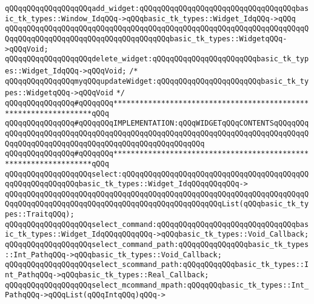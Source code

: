 \newline
\verb|qQQqqQQqqQQqqQQqqQQqadd_widget:qQQqqQQqqQQqqQQqqQQqqQQqqQQqqQQqqQQqbasic_tk_types::Window_IdqQQq->qQQqbasic_tk_types::Widget_IdqQQq->qQQq|\newline
\verb|qQQqqQQqqQQqqQQqqQQqqQQqqQQqqQQqqQQqqQQqqQQqqQQqqQQqqQQqqQQqqQQqqQQqqQQqqQQqqQQqqQQqqQQqqQQqqQQqqQQqqQQqqQQqbasic_tk_types::WidgetqQQq->qQQqVoid;|\newline
\verb|qQQqqQQqqQQqqQQqqQQqdelete_widget:qQQqqQQqqQQqqQQqqQQqqQQqbasic_tk_types::Widget_IdqQQq->qQQqVoid;|\newline
\verb|/*|\newline
\verb|qQQqqQQqqQQqqQQqmyqQQqupdateWidget:qQQqqQQqqQQqqQQqqQQqqQQqbasic_tk_types::WidgetqQQq->qQQqVoid|\newline
\verb|*/|\newline
\newline
\verb|qQQqqQQqqQQqqQQq#qQQqqQQq*****************************************************************qQQq|\newline
\verb|qQQqqQQqqQQqqQQq#qQQqqQQqIMPLEMENTATION:qQQqWIDGETqQQqCONTENTSqQQqqQQqqQQqqQQqqQQqqQQqqQQqqQQqqQQqqQQqqQQqqQQqqQQqqQQqqQQqqQQqqQQqqQQqqQQqqQQqqQQqqQQqqQQqqQQqqQQqqQQqqQQqqQQqqQQqqQQqqQQq|\newline
\verb|qQQqqQQqqQQqqQQq#qQQqqQQq*****************************************************************qQQq|\newline
\newline
\verb|qQQqqQQqqQQqqQQqqQQqselect:qQQqqQQqqQQqqQQqqQQqqQQqqQQqqQQqqQQqqQQqqQQqqQQqqQQqqQQqqQQqbasic_tk_types::Widget_IdqQQqqQQqqQQq->|\newline
\verb|qQQqqQQqqQQqqQQqqQQqqQQqqQQqqQQqqQQqqQQqqQQqqQQqqQQqqQQqqQQqqQQqqQQqqQQqqQQqqQQqqQQqqQQqqQQqqQQqqQQqqQQqqQQqqQQqqQQqqQQqList(qQQqbasic_tk_types::TraitqQQq);|\newline
\verb|qQQqqQQqqQQqqQQqqQQqselect_command:qQQqqQQqqQQqqQQqqQQqqQQqqQQqqQQqbasic_tk_types::Widget_IdqQQqqQQqqQQq->qQQqbasic_tk_types::Void_Callback;|\newline
\verb|qQQqqQQqqQQqqQQqqQQqselect_command_path:qQQqqQQqqQQqqQQqbasic_tk_types::Int_PathqQQq->qQQqbasic_tk_types::Void_Callback;|\newline
\verb|qQQqqQQqqQQqqQQqqQQqselect_scommand_path:qQQqqQQqqQQqbasic_tk_types::Int_PathqQQq->qQQqbasic_tk_types::Real_Callback;|\newline
\verb|qQQqqQQqqQQqqQQqqQQqselect_mcommand_mpath:qQQqqQQqbasic_tk_types::Int_PathqQQq->qQQqList(qQQqIntqQQq)qQQq->|\newline
